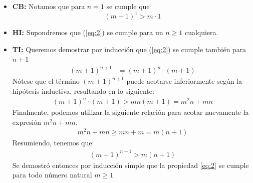 \documentclass[12pt]{article}
\begin{document}
\begin{itemize}
    \item \textbf{CB:}
    Notamos que para $n = 1$ se cumple que
    \begin{equation*}
        (m + 1)^1 > m \cdot 1
    \end{equation*}

    \item \textbf{HI:}
    Supondremos que (\ref*{eq:2}) se cumple para  un $n \geq 1$ cualquiera.

    \item \textbf{TI:}
    Queremos demostrar por inducción que (\ref*{eq:2}) se cumple también para $n+1$
    \begin{align*}
        (m + 1)^{n+1}
        &= (m + 1)^n \cdot (m + 1)
    \end{align*}
    Nótese que el término $(m + 1)^{n+1}$ puede acotarse inferiormente según la hipótesis inductiva,
    resultando en lo siguiente:
    \begin{align*}
        (m + 1)^n \cdot (m + 1) > mn(m + 1) = m^2n + mn
    \end{align*}
    Finalmente, podemos utilizar la siguiente relación para acotar nuevamente 
    la expresión $m^2n + mn$.
    \begin{align*}
        m^2n + mn \geq mn + m = m(n+1)
    \end{align*}
    Resumiendo, tenemos que:
    \begin{align*}
        (m + 1)^{n+1} > m(n+1)
    \end{align*}
    Se demostró entonces por inducción simple que la propiedad \ref*{eq:2} se cumple 
    para todo número natural $m \geq 1$ 
\end{itemize}


\newpage
\end{document}
